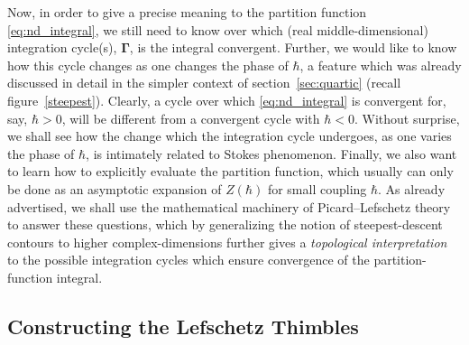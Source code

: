 \documentclass[11pt,a4paper]{article}
\begin{document}
Now, in order to give a precise meaning to the partition function \eqref{eq:nd_integral}, we still need to know over which (real middle-dimensional) integration cycle(s), $\boldsymbol{\Gamma}$, is the integral convergent. Further, we would like to know how this cycle changes as one changes the phase of $\hbar$, a feature which was already discussed in detail in the simpler context of section~\ref{sec:quartic} (recall figure~\ref{steepest}). Clearly, a cycle over which \eqref{eq:nd_integral} is convergent for, say, $\hbar>0$, will be different from a convergent cycle with $\hbar<0$. Without surprise, we shall see how the change which the integration cycle undergoes, as one varies the phase of $\hbar$, is intimately related to Stokes phenomenon. Finally, we also want to learn how to explicitly evaluate the partition function, which usually can only be done as an asymptotic expansion of $Z (\hbar)$ for small coupling $\hbar$. As already advertised, we shall use the mathematical machinery of Picard--Lefschetz theory to answer these questions, which by generalizing the notion of steepest-descent contours to higher complex-dimensions further gives a \textit{topological interpretation} to the possible integration cycles which ensure convergence of the partition-function integral.

\subsection*{Constructing the Lefschetz Thimbles}
\end{document}

